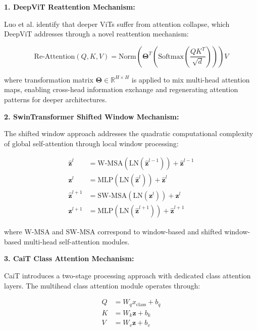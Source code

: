 \documentclass[journal]{IEEEtran}
\begin{document}
\textbf{1. DeepViT Reattention Mechanism:}

Luo et al. identify that deeper ViTs suffer from attention collapse, which DeepViT addresses through a novel reattention mechanism:

\begin{equation}
\text{Re-Attention}(Q, K, V) = \text{Norm}\left(\boldsymbol{\Theta}^T\left(\text{Softmax}\left(\frac{QK^T}{\sqrt{d}}
\right)
\right)
\right)V
\label{eq:vit_reattention}
\end{equation}

where transformation matrix $\boldsymbol{\Theta} \in \mathbb{R}^{H \times H}$ is applied to mix multi-head attention maps, enabling cross-head information exchange and regenerating attention patterns for deeper architectures.

\textbf{2. SwinTransformer Shifted Window Mechanism:}

The shifted window approach addresses the quadratic computational complexity of global self-attention through local window processing:

\begin{align}
\hat{\mathbf{z}}^l &= \text{W-MSA}(\text{LN}(\hat{\mathbf{z}}^{l-1})) + \hat{\mathbf{z}}^{l-1} \label{eq:vit_swin_1} \\
\mathbf{z}^l &= \text{MLP}(\text{LN}(\hat{\mathbf{z}}^l)) + \hat{\mathbf{z}}^l \label{eq:vit_swin_2} \\
\hat{\mathbf{z}}^{l+1} &= \text{SW-MSA}(\text{LN}(\mathbf{z}^l)) + \mathbf{z}^l \label{eq:vit_swin_3} \\
\mathbf{z}^{l+1} &= \text{MLP}(\text{LN}(\hat{\mathbf{z}}^{l+1})) + \hat{\mathbf{z}}^{l+1} \label{eq:vit_swin_4}
\end{align}

where W-MSA and SW-MSA correspond to window-based and shifted window-based multi-head self-attention modules.

\textbf{3. CaiT Class Attention Mechanism:}

CaiT introduces a two-stage processing approach with dedicated class attention layers. The multihead class attention module operates through:

\begin{align}
Q &= W_q x_{\text{class}} + b_q \label{eq:vit_cait_q} \\
K &= W_k \mathbf{z} + b_k \label{eq:vit_cait_k} \\
V &= W_v \mathbf{z} + b_v \label{eq:vit_cait_v}
\end{align}
\end{document}
